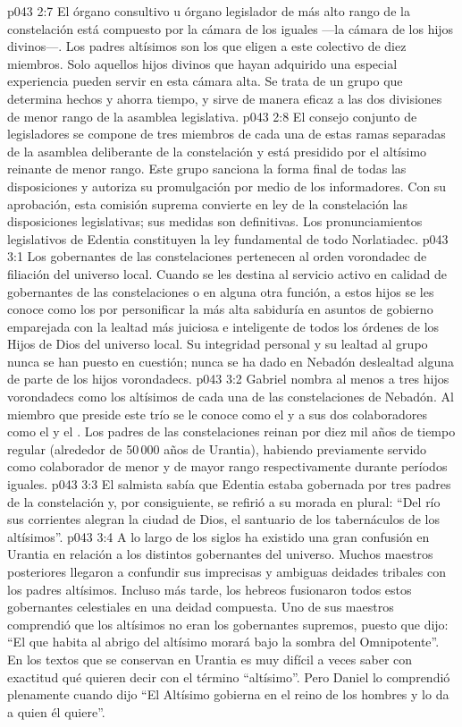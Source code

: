 \vs p043 2:7 El órgano consultivo u órgano legislador de más alto rango de la constelación está compuesto por la cámara de los iguales ---la cámara de los hijos divinos---. Los padres altísimos son los que eligen a este colectivo de diez miembros. Solo aquellos hijos divinos que hayan adquirido una especial experiencia pueden servir en esta cámara alta. Se trata de un grupo que determina hechos y ahorra tiempo, y sirve de manera eficaz a las dos divisiones de menor rango de la asamblea legislativa.
\vs p043 2:8 El consejo conjunto de legisladores se compone de tres miembros de cada una de estas ramas separadas de la asamblea deliberante de la constelación y está presidido por el altísimo reinante de menor rango. Este grupo sanciona la forma final de todas las disposiciones y autoriza su promulgación por medio de los informadores. Con su aprobación, esta comisión suprema convierte en ley de la constelación las disposiciones legislativas; sus medidas son definitivas. Los pronunciamientos legislativos de Edentia constituyen la ley fundamental de todo Norlatiadec.
\vs p043 3:1 Los gobernantes de las constelaciones pertenecen al orden vorondadec de filiación del universo local. Cuando se les destina al servicio activo en calidad de gobernantes de las constelaciones o en alguna otra función, a estos hijos se les conoce como los  por personificar la más alta sabiduría en asuntos de gobierno emparejada con la lealtad más juiciosa e inteligente de todos los órdenes de los Hijos de Dios del universo local. Su integridad personal y su lealtad al grupo nunca se han puesto en cuestión; nunca se ha dado en Nebadón deslealtad alguna de parte de los hijos vorondadecs.
\vs p043 3:2 \pc Gabriel nombra al menos a tres hijos vorondadecs como los altísimos de cada una de las constelaciones de Nebadón. Al miembro que preside este trío se le conoce como el  y a sus dos colaboradores como el  y el . Los padres de las constelaciones reinan por diez mil años de tiempo regular (alrededor de 50\,000 años de Urantia), habiendo previamente servido como colaborador de menor y de mayor rango respectivamente durante períodos iguales.
\vs p043 3:3 El salmista sabía que Edentia estaba gobernada por tres padres de la constelación y, por consiguiente, se refirió a su morada en plural: “Del río sus corrientes alegran la ciudad de Dios, el santuario de los tabernáculos de los altísimos”.
\vs p043 3:4 \pc A lo largo de los siglos ha existido una gran confusión en Urantia en relación a los distintos gobernantes del universo. Muchos maestros posteriores llegaron a confundir sus imprecisas y ambiguas deidades tribales con los padres altísimos. Incluso más tarde, los hebreos fusionaron todos estos gobernantes celestiales en una deidad compuesta. Uno de sus maestros comprendió que los altísimos no eran los gobernantes supremos, puesto que dijo: “El que habita al abrigo del altísimo morará bajo la sombra del Omnipotente”. En los textos que se conservan en Urantia es muy difícil a veces saber con exactitud qué quieren decir con el término “altísimo”. Pero Daniel lo comprendió plenamente cuando dijo “El Altísimo gobierna en el reino de los hombres y lo da a quien él quiere”.
